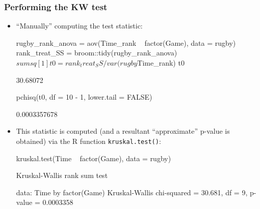 \documentclass[a4paper]{article}
\begin{document}
\subsubsection{Performing the KW test}
\begin{itemize}
	\item ``Manually'' computing the test statistic:
\begin{Schunk}
\begin{Sinput}
rugby_rank_anova = aov(Time_rank ~ factor(Game), data = rugby)
rank_treat_SS = broom::tidy(rugby_rank_anova)$sumsq[1]
t0 = rank_treat_SS/var(rugby$Time_rank)
t0
\end{Sinput}
\begin{Soutput}
[1] 30.68072
\end{Soutput}
\begin{Sinput}
pchisq(t0, df = 10 - 1, lower.tail = FALSE)
\end{Sinput}
\begin{Soutput}
[1] 0.0003357678
\end{Soutput}
\end{Schunk}
	\item This statistic is computed (and a resultant ``approximate'' p-value is obtained) via the R function \lstinline|kruskal.test()|:
\begin{Schunk}
\begin{Sinput}
kruskal.test(Time ~ factor(Game), data = rugby)
\end{Sinput}
\begin{Soutput}

	Kruskal-Wallis rank sum test

data:  Time by factor(Game)
Kruskal-Wallis chi-squared = 30.681, df = 9, p-value = 0.0003358
\end{Soutput}
\end{Schunk}
\end{itemize}
\end{document}
